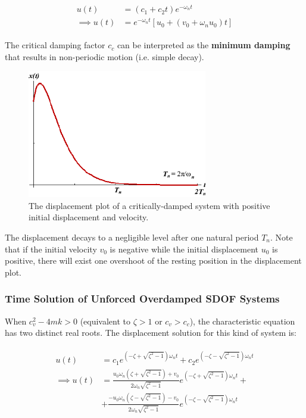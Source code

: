 \documentclass[10pt,b5paper,titlepage]{book}
\newenvironment{eqarray}
{
    \begin{eqnarray}
        \begin{aligned}
}
{
        \end{aligned}
    \end{eqnarray}
}
\begin{document}
\begin{eqarray}
    u(t) &= \left( c_1 + c_2 t \right) e^{-\omega_n t}\\
    \implies u(t) &= e^{-\omega_n t} \left[ u_0 + \left( v_0 + \omega_n u_0 \right) t \right]
\end{eqarray}

The critical damping factor $ c_c $ can be interpreted as the \textbf{minimum damping}
that results in non-periodic motion (i.e. simple decay).

\begin{figure}[ht]
    \centering
    \includegraphics[width=0.70\textwidth]{img/SDOF_CriticalDamped_Response.png}
    \caption{The displacement plot of a critically-damped system with positive initial
displacement and velocity.}
    \label{fig:SDOF-critically-damped-response-png}
\end{figure}

The displacement decays to a negligible level after one natural period $ T_n $.
Note that if the initial velocity $ v_0 $ is negative while the initial displacement
$ u_0 $ is positive, there will exist one overshoot of the resting position in
the displacement plot.


\subsubsection{Time Solution of Unforced Overdamped SDOF Systems}

When $ c_v^2 - 4 m k > 0 $ (equivalent to $ \zeta > 1 $ or $ c_v > c_c $),
the characteristic equation has two distinct real roots. The displacement
solution for this kind of system is:

\begin{eqarray}
    u(t) &= c_1 e^{\left( -\zeta + \sqrt{\zeta^2 - 1} \right) \omega_n t}
          +  c_2 e^{\left( -\zeta - \sqrt{\zeta^2 - 1} \right) \omega_n t}\\
    \implies u(t) &=
    \frac{u_0 \omega_n \left( \zeta + \sqrt{\zeta^2 - 1} \right) + v_0}
    {2 \omega_n \sqrt{\zeta^2 - 1}} e^{\left( -\zeta + \sqrt{\zeta^2 - 1} \right) \omega_n t} +\\
                  &+
    \frac{-u_0 \omega_n \left( \zeta - \sqrt{\zeta^2 - 1} \right) - v_0}
    {2 \omega_n \sqrt{\zeta^2 - 1}} e^{\left( -\zeta - \sqrt{\zeta^2 - 1} \right) \omega_n t}
\end{eqarray}
\end{document}
